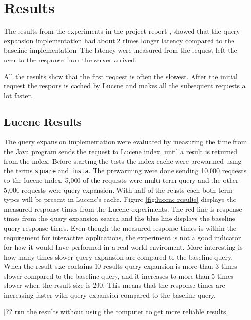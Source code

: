 \section{Results}
\label{sec:results}
The results from the experiments in the project report \cite{project-report},
showed that the query expansion implementation had about 2 times longer latency compared to the baseline implementation.
The latency were measured from the request left the user to the response from the server arrived.

All the results show that the first request is often the slowest.
After the initial request the respons is cached by Lucene and makes all the subsequent requests a lot faster.

\subsection{Lucene Results}
The query expansion implementation were evaluated by measuring the time from the Java program sends the request to Lucene index,
until a result is returned from the index.
Before starting the tests the index cache were prewarmed using the terms \texttt{square} and \texttt{insta}.
The prewarming were done sending 10,000 requests to the lucene index.
5,000 of the requests were multi term query and the other 5,000 requests were query expansion.
With half of the reusts each both term types will be present in Lucene's cache.
Figure \ref{fig:lucene-results} displays the measured response times from the Lucene experiments.
The red line is response times from the query expansion search and the blue line displays the baseline query response times.
Even though the measured response times is within the requirement for interactive applications,
the experiment is not a good indicator for how it would have performed in a real world enviroment.
More interesting is how many times slower query expansion are compared to the baseline query.
When the result size contains 10 results query expansion is more than 3 times slower compared to the baseline query,
and it increases to more than 5 times slower when the result size is 200.
This means that the response times are increasing faster with query expansion compared to the baseline query.

[?? run the results without using the computer to get more reliable results]

